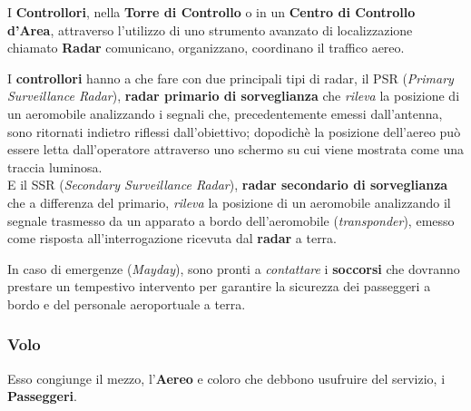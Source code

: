\pagebreak

\textsf{\small I \textbf{Controllori}, nella \textbf{Torre di Controllo} o in un \textbf{Centro di Controllo d'Area}, attraverso l'utilizzo di uno strumento avanzato di localizzazione chiamato \textbf{Radar} comunicano, organizzano, coordinano il traffico aereo.}\break

\textsf{\small I \textbf{controllori} hanno a che fare con due principali tipi di radar, il PSR (\emph{Primary Surveillance Radar}), \textbf{radar primario di sorveglianza} che \emph{rileva} la posizione di un aeromobile analizzando i segnali che, precedentemente emessi dall'antenna, sono ritornati indietro riflessi dall'obiettivo; dopodichè la posizione dell'aereo può essere letta dall'operatore attraverso uno schermo su cui viene mostrata come una traccia luminosa.}\\

\textsf{\small E il SSR (\emph{Secondary Surveillance Radar}), \textbf{radar secondario di sorveglianza} che a differenza del primario, \emph{rileva} la posizione di un aeromobile analizzando il segnale trasmesso da un apparato a bordo dell'aeromobile (\emph{transponder}), emesso come risposta all'interrogazione ricevuta dal \textbf{radar} a terra.}\break

\textsf{\small In caso di emergenze (\emph{Mayday}), sono pronti a \emph{contattare} i \textbf{soccorsi} che dovranno prestare un tempestivo intervento per garantire la sicurezza dei passeggeri a bordo e del personale aeroportuale a terra. }\\


\newpage

\subsubsection{Volo}


\textsf{\small Esso congiunge il mezzo, l'\textbf{Aereo} e coloro che debbono usufruire del servizio, i \textbf{Passeggeri}.}\\

